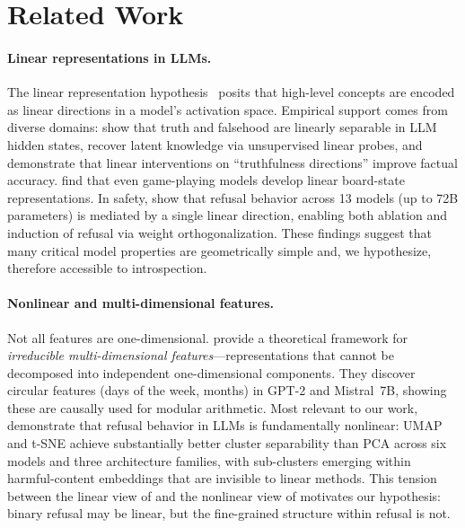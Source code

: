 \section{Related Work}
\label{sec:related}

\paragraph{Linear representations in LLMs.}
The linear representation hypothesis~\cite{park2023linear} posits that high-level concepts are encoded as linear directions in a model's activation space. Empirical support comes from diverse domains: \citet{marks2023geometry} show that truth and falsehood are linearly separable in LLM hidden states, \citet{burns2022discovering} recover latent knowledge via unsupervised linear probes, and \citet{li2023inference} demonstrate that linear interventions on ``truthfulness directions'' improve factual accuracy. \citet{nanda2023emergent} find that even game-playing models develop linear board-state representations. In safety, \citet{arditi2024refusal} show that refusal behavior across 13 models (up to 72B parameters) is mediated by a single linear direction, enabling both ablation and induction of refusal via weight orthogonalization. These findings suggest that many critical model properties are geometrically simple and, we hypothesize, therefore accessible to introspection.

\paragraph{Nonlinear and multi-dimensional features.}
Not all features are one-dimensional. \citet{engels2025not} provide a theoretical framework for \emph{irreducible multi-dimensional features}---representations that cannot be decomposed into independent one-dimensional components. They discover circular features (days of the week, months) in GPT-2 and Mistral~7B, showing these are causally used for modular arithmetic. Most relevant to our work, \citet{hildebrandt2025refusal} demonstrate that refusal behavior in LLMs is fundamentally nonlinear: UMAP and t-SNE achieve substantially better cluster separability than PCA across six models and three architecture families, with sub-clusters emerging within harmful-content embeddings that are invisible to linear methods. This tension between the linear view of \citet{arditi2024refusal} and the nonlinear view of \citet{hildebrandt2025refusal} motivates our hypothesis: binary refusal may be linear, but the fine-grained structure within refusal is not.

